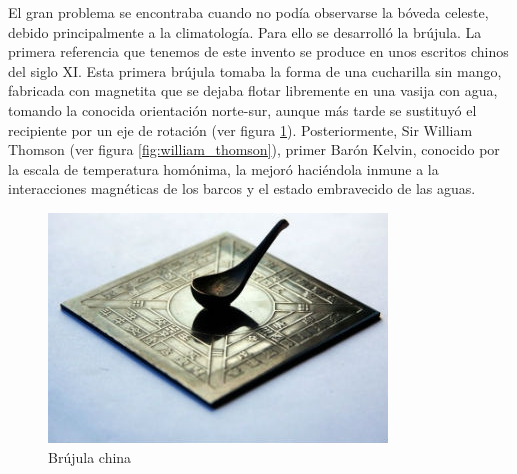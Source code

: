 El gran problema se encontraba cuando no podía observarse la bóveda celeste, debido principalmente a la climatología. Para ello se desarrolló la brújula. 
La primera referencia que tenemos de este invento se produce en unos escritos chinos del siglo XI. Esta primera brújula tomaba la forma de una cucharilla sin mango, fabricada con magnetita que se dejaba flotar libremente en una vasija con agua, tomando la conocida orientación norte-sur, aunque más tarde se sustituyó el recipiente por un eje de rotación (ver figura \ref{fig:chinese_compass}).
Posteriormente, Sir William Thomson (ver figura \ref{fig:william_thomson}), primer Barón Kelvin, conocido por la escala de temperatura homónima, la mejoró haciéndola inmune a la interacciones magnéticas de los barcos y el estado embravecido de las aguas. 

\begin{figure}[h!btp]
\centering
\includegraphics[scale=0.5, fbox={\fboxrule} 4mm]{images/03-antecedentes/53-chinese_compass.jpg}
\caption{Brújula china}
\label{fig:chinese_compass}
\end{figure}

